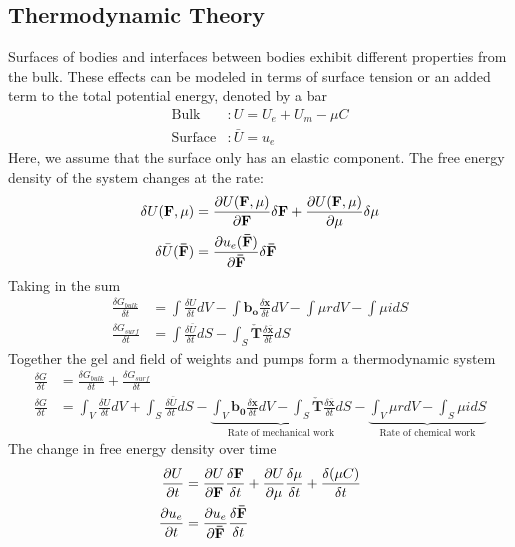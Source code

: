 \documentclass[12pt,3p]{article}
\numberwithin{equation}{section}
\begin{document}
\subsection{Thermodynamic Theory}
\vspace{-1ex}
Surfaces of bodies and interfaces between bodies exhibit different properties from the bulk. These effects can be modeled in terms of surface tension or an added term to the total potential energy, denoted by a bar 
\begin{align*} 
\text{Bulk}&: U = U_e + U_m - \mu C \\
\text{Surface}&:\bar{U} = u_e
\end{align*}
Here, we assume that the surface only has an elastic component. The free energy density of the system changes at the rate: 
\begin{align*}
\delta U (\mathbf{F}, \mu) &= \pdv{U (\mathbf{F}, \mu)}{\mathbf{F}} \delta \mathbf{F}+ \pdv{U (\mathbf{F}, \mu)}{\mu} \delta \mu \\
\delta \bar{U} (\mathbf{\bar{F}}) &=  \pdv{u_e (\mathbf{\bar{F}})}{\mathbf{\bar{F}}} \delta \mathbf{\bar{F}}
\end{align*}
Taking in the sum 
\begin{align*}
 \frac{\delta G_{bulk}}{\delta t} &= \int \frac{\delta U}{\delta t} dV  - \int \mathbf{b_o} \frac{\delta \mathbf{x}}{\delta t} dV - \int \mu r dV - \int \mu i dS \\
\frac{\delta G_{surf}}{\delta t} &= \int \frac{\delta \bar{U}}{\delta t} dS - \int_{S} \check{\mathbf{T}} \frac{\delta \overline{\mathbf{x}}}{\delta t} d S 
\end{align*}
Together the gel and field of weights and pumps form a thermodynamic system
\begin{align*}
\frac{\delta G}{\delta t} &= \frac{\delta G_{bulk}}{\delta t} + \frac{\delta G_{surf}}{\delta t} \\
\frac{\delta G}{\delta t} &= \int_{V} \frac{\delta U}{\delta t} d V + \int_{S} \frac{\delta \bar{U}}{\delta t} d S - 
\underbrace{\int_{V} \mathbf{b}_{\mathbf{0}} \frac{\delta \mathbf{x}}{\delta t} d V - \int_{S} \check{\mathbf{T}} \frac{\delta \overline{\mathbf{x}}}{\delta t} d S}_\text{Rate of mechanical work}
- \underbrace{\int_{V} \mu r d V-\int_{S} \mu i d S}_\text{Rate of chemical work} 
\end{align*}
The change in free energy density over time 
\begin{align*}
\pdv{U}{t} &= \pdv{U}{\mathbf{F}} \frac{\delta \mathbf{F}}{\delta t}+ \pdv{U}{\mu} \frac{\delta \mu}{\delta t} + \frac{\delta (\mu C)}{\delta t} \\
\pdv{u_e}{t} &= \pdv{u_e}{\mathbf{\bar{F}}} \frac{\delta \mathbf{\bar{F}}}{\delta t}
\end{align*}
\end{document}
